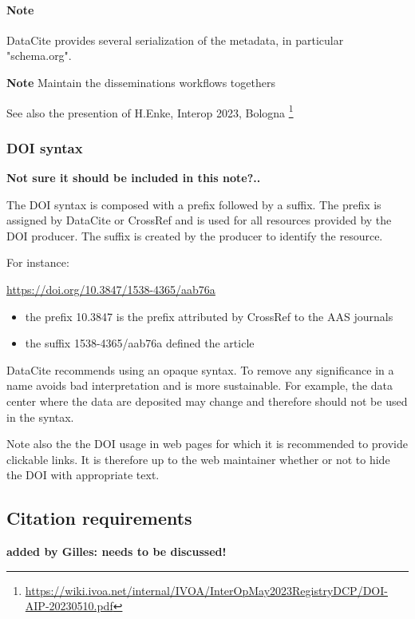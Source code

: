 \documentclass[11pt,a4paper]{ivoa}
\newcommand{\important}[1]{
	\begin{bigdescription}
		\item \color{ivoacolor}\textbf{Note} #1
	\end{bigdescription}
}
\begin{document}
\paragraph{Note} DataCite provides several serialization of the metadata, in particular "schema.org".

\important{
Maintain the disseminations workflows togethers
}

See also the presention of H.Enke, Interop 2023, Bologna \footnote{\url{https://wiki.ivoa.net/internal/IVOA/InterOpMay2023RegistryDCP/DOI-AIP-20230510.pdf}}


\subsubsection{DOI syntax}
\textbf{\color{red} Not sure it should be included in this note?..}

The DOI syntax is composed with a prefix followed by a suffix.
The prefix is assigned by DataCite or CrossRef and is used for all resources provided by the DOI producer. The suffix is created by the producer to identify the resource.

For instance: 

\url{https://doi.org/10.3847/1538-4365/aab76a}

\begin{itemize}
	\item the prefix 10.3847 is the prefix attributed by CrossRef to the AAS journals 
	\item the suffix 1538-4365/aab76a defined the article 
\end{itemize}

DataCite recommends using an opaque syntax. To remove any significance
in a name avoids bad interpretation and is more sustainable. For example,
the data center where the data are deposited may change and therefore
should not be used in the syntax.

Note also the the DOI usage in web pages for which it is recommended to provide clickable links. It is therefore up to the web maintainer whether or not to hide the DOI with appropriate text.

\subsection{Citation requirements}
\label{sec:citation}
\textbf{\color{red} added by Gilles: needs to be discussed!}
\end{document}
